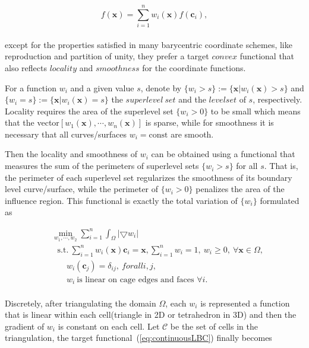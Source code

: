 \small{
\begin{equation}
 \label{eq:BC}
 f(\mathbf{x}) = \sum_{i=1}^{n}w_{i}(\mathbf{x})f(\mathbf{c}_{i}),
\end{equation}
}
\\
except for the properties satisfied in many barycentric coordinate schemes, like reproduction and partition of unity,
they prefer a target $convex$ functional that also reflects $locality$ and $smoothness$ for the coordinate functions.

For a function $w_{i}$ and a given value $s$, denote by $\{w_{i}>s\}:=\{\mathbf{x}|w_{i}(\mathbf{x})>s\}$ and $\{w_{i}=s\}:=\{\mathbf{x}|w_{i}(\mathbf{x})=s\}$ the $superlevel~set$ and the $level set$ of $s$, respectively.
Locality requires the area of the superlevel set $\{w_{i}>0\}$ to be small which means that the vector$[w_{1}(\mathbf{x}), \cdots, w_{n}(\mathbf{x})]$ is sparse, while for smoothness it is necessary that all curves/surfaces $w_{i}=\textrm{const}$ are smooth.

Then the locality and smoothness of $w_{i}$ can be obtained using a functional that measures the sum of the perimeters of superlevel sets $\{w_{i}>s\}$ for all $s$.
That is, the perimeter of each superlevel set regularizes the smoothness of its boundary level curve/surface, while the perimeter of $\{w_{i}>0\}$ penalizes the area of the influence region. 
This functional is exactly the total variation of $\{w_{i}\}$ formulated as

\small{
\begin{equation}
 \label{eq:continuousLBC}
 \begin{aligned}
 & \min_{w_1, \cdots, w_2} \sum_{i=1}^{n} \int_{\Omega}^{} |\bigtriangledown w_{i}| \\
 & ~~~\mathrm{s.t.}~ \sum_{i=1}^{n}w_{i}(\mathbf{x})\mathbf{c}_{i}=\mathbf{x},
        \sum_{i=1}^{n}w_{i}=1,~w_{i}\geq0,~\forall \mathbf{x}\in\Omega,\\
 & ~~~~~~~~w_{i}(\mathbf{c}_{j})=\delta_{ij},~forall i,j,\\
 & ~~~~~~~~w_{i}~\textrm{is linear on cage edges and faces }\forall i.
 \end{aligned}
\end{equation}
}
\\
Discretely, after triangulating the domain $\Omega$, each $w_{i}$ is represented a function that is linear within each cell(triangle in 2D or tetrahedron in 3D) and then the gradient of $w_{i}$ is constant on each cell. Let $\mathcal{C}$ be the set of cells in the triangulation, the target functional~(\ref{eq:continuousLBC}) finally becomes

